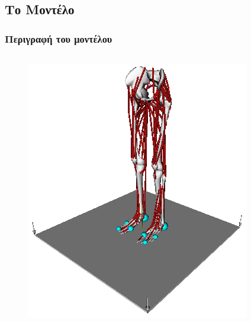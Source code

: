 \documentclass[8pt,sans,mathserif,aspectratio=43]{beamer}%
\begin{document}
\subsection{Το Μοντέλο}
\begin{frame}
\frametitle{Περιγραφή του μοντέλου}
    
    \begin{columns}
        \begin{figure}[t]
            \includegraphics[width=1.0\linewidth, keepaspectratio]{fig/lower-limb-model.png}
        \end{figure}
        
        \pause
        

\end{columns}
\end{frame}
\end{document}
